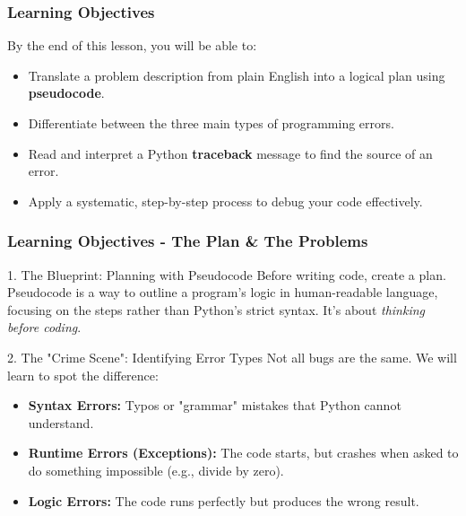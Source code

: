 \documentclass{beamer}
\begin{document}
\begin{frame}[fragile]
    \frametitle{Learning Objectives}
    By the end of this lesson, you will be able to:
    \begin{itemize}
        \item<1-> Translate a problem description from plain English into a logical plan using \textbf{pseudocode}.
        \item<2-> Differentiate between the three main types of programming errors.
        \item<3-> Read and interpret a Python \textbf{traceback} message to find the source of an error.
        \item<4-> Apply a systematic, step-by-step process to debug your code effectively.
    \end{itemize}
\end{frame}

\begin{frame}[fragile]
    \frametitle{Learning Objectives - The Plan \& The Problems}
    
    \begin{block}{1. The Blueprint: Planning with Pseudocode}
        Before writing code, create a plan. Pseudocode is a way to outline a program's logic in human-readable language, focusing on the steps rather than Python's strict syntax. It's about \textit{thinking before coding}.
    \end{block}
    
    \vspace{1em}
    
    \begin{block}{2. The "Crime Scene": Identifying Error Types}
        Not all bugs are the same. We will learn to spot the difference:
        \begin{itemize}
            \item \textbf{Syntax Errors:} Typos or "grammar" mistakes that Python cannot understand.
            \item \textbf{Runtime Errors (Exceptions):} The code starts, but crashes when asked to do something impossible (e.g., divide by zero).
            \item \textbf{Logic Errors:} The code runs perfectly but produces the wrong result.
        \end{itemize}
    \end{block}
\end{frame}
\end{document}
